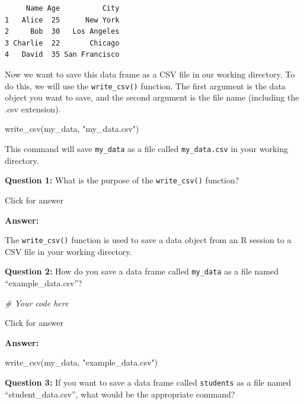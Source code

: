 \documentclass[
]{book}
\newenvironment{Shaded}{\begin{snugshade}}{\end{snugshade}}
\newcommand{\CommentTok}[1]{\textcolor[rgb]{0.56,0.35,0.01}{\textit{#1}}}
\newcommand{\FunctionTok}[1]{\textcolor[rgb]{0.00,0.00,0.00}{#1}}
\newcommand{\NormalTok}[1]{#1}
\newcommand{\StringTok}[1]{\textcolor[rgb]{0.31,0.60,0.02}{#1}}
\begin{document}
\begin{verbatim}
     Name Age          City
1   Alice  25      New York
2     Bob  30   Los Angeles
3 Charlie  22       Chicago
4   David  35 San Francisco
\end{verbatim}

Now we want to save this data frame as a CSV file in our working directory. To do this, we will use the \texttt{write\_csv()} function. The first argument is the data object you want to save, and the second argument is the file name (including the .csv extension).

\begin{Shaded}
\begin{Highlighting}[]
\FunctionTok{write\_csv}\NormalTok{(my\_data, }\StringTok{"my\_data.csv"}\NormalTok{)}
\end{Highlighting}
\end{Shaded}

This command will save \texttt{my\_data} as a file called \texttt{my\_data.csv} in your working directory.

\textbf{Question 1:} What is the purpose of the \texttt{write\_csv()} function?

Click for answer

\textbf{Answer:}

The \texttt{write\_csv()} function is used to save a data object from an R session to a CSV file in your working directory.

\textbf{Question 2:} How do you save a data frame called \texttt{my\_data} as a file named ``example\_data.csv''?

\begin{Shaded}
\begin{Highlighting}[]
\CommentTok{\# Your code here}
\end{Highlighting}
\end{Shaded}

Click for answer

\textbf{Answer:}

\begin{Shaded}
\begin{Highlighting}[]
\FunctionTok{write\_csv}\NormalTok{(my\_data, }\StringTok{"example\_data.csv"}\NormalTok{)}
\end{Highlighting}
\end{Shaded}

\textbf{Question 3:} If you want to save a data frame called \texttt{students} as a file named ``student\_data.csv'', what would be the appropriate command?
\end{document}
